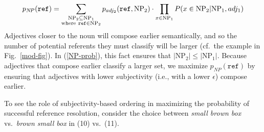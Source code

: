 \documentclass[preprint,authoryear]{elsarticle}\frenchspacing
\begin{document}
\begin{equation}
\label{NP-prob}
p_{N\!P}(\texttt{ref}) = \sum_{\substack{\textrm{NP}_2\subseteq\textrm{NP}_1\\ \textrm{where}\ \texttt{ref}\in\textrm{NP}_2}} p_{adj_2}(\texttt{ref}, \textrm{NP}_2) \cdot \prod_{x \in \textrm{NP}_1} P(x \in \textrm{NP}_2 | \textrm{NP}_1, adj_1)  \\
\end{equation}
%
%
%
Adjectives closer to the noun will compose earlier semantically, and so the number of potential referents they must classify will be larger (cf.~the example in Fig.~\ref{mod-fig}). In (\ref{NP-prob}), this fact ensures that $|\textrm{NP}_2| \leq |\textrm{NP}_1|$. 
Because adjectives that compose earlier classify a larger set, we maximize $p_{N\!P}(\texttt{ref})$ by ensuring that adjectives with lower subjectivity (i.e., with a lower $\epsilon$) compose earlier.

To see the role of subjectivity-based ordering in maximizing the probability of successful reference resolution, consider the choice between \emph{small brown box} vs.~\emph{brown small box} in (10) vs.~(11).\\ 
\end{document}
